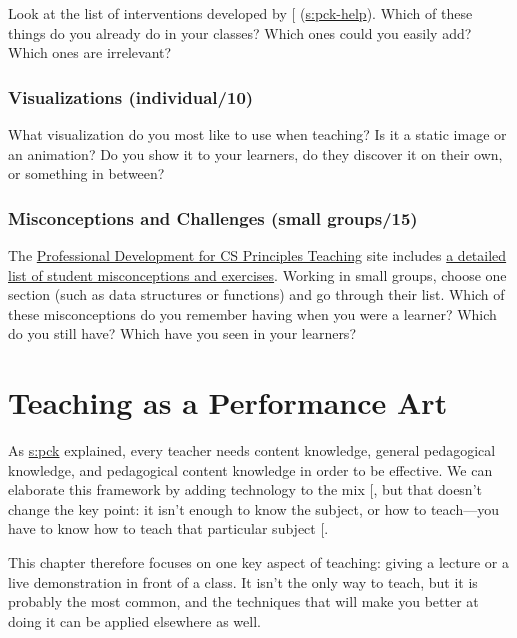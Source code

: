 Look at the list of interventions developed by {[}\protect[\hyperlink{b:Viha2014}{Viha2014}]{]}
(\protect\hyperlink{SECTION}{s:pck-help}). Which of these things do you already do in
your classes? Which ones could you easily add? Which ones are
irrelevant?

\subsection{Visualizations (individual/10)}\label{visualizations-individual10}

What visualization do you most like to use when teaching? Is it a static
image or an animation? Do you show it to your learners, do they discover
it on their own, or something in between?

\subsection{Misconceptions and Challenges (small groups/15)}\label{misconceptions-and-challenges-small-groups15}

The \href{http://www.pd4cs.org/}{Professional Development for CS Principles Teaching} site
includes \href{http://www.pd4cs.org/mc-index/}{a detailed list of student misconceptions and
exercises}. Working in small groups, choose one
section (such as data structures or functions) and go through their
list. Which of these misconceptions do you remember having when you
were a learner? Which do you still have? Which have you seen in your
learners?

\chapter{Teaching as a Performance Art}\label{s:performance}

As \protect\hyperlink{CHAPTER}{s:pck} explained, every teacher needs content knowledge,
general pedagogical knowledge, and pedagogical content knowledge in
order to be effective. We can elaborate this framework by adding
technology to the mix {[}\protect[\hyperlink{b:Koeh2013}{Koeh2013}]{]}, but that doesn't change the
key point: it isn't enough to know the subject, or how to teach---you have
to know how to teach that particular subject {[}\protect[\hyperlink{b:Maye2004}{Maye2004}]{]}.

This chapter therefore focuses on one key aspect of teaching: giving a
lecture or a live demonstration in front of a class. It isn't the only
way to teach, but it is probably the most common, and the techniques
that will make you better at doing it can be applied elsewhere as well.

